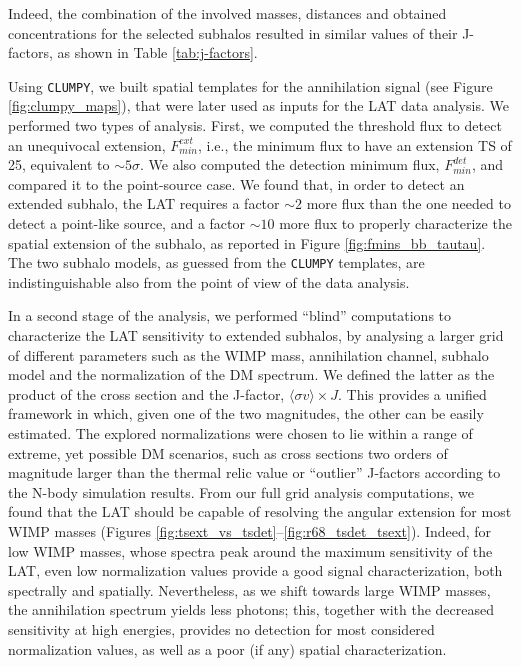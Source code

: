 \documentclass[%
 reprint,
nofootinbib,
 amsmath,amssymb,
 aps,
]{revtex4-2}
\begin{document}
Indeed, the combination of the involved masses, distances and obtained concentrations for the selected subhalos resulted in similar values of their J-factors, as shown in Table \ref{tab:j-factors}.

Using \texttt{CLUMPY}, we built spatial templates for the annihilation signal (see Figure \ref{fig:clumpy_maps}), that were later used as inputs for the LAT data analysis. We performed two types of analysis. First, we computed the threshold flux to detect an unequivocal extension, $F_{min}^{ext}$, i.e., the minimum flux to have an extension TS of 25, equivalent to $\sim 5\sigma$. We also computed the detection minimum flux, $F_{min}^{det}$, and compared it to the point-source case. We found that, in order to detect an extended subhalo, the LAT requires a factor $\sim2$ more flux than the one needed to detect a point-like source, and a factor $\sim10$ more flux to properly characterize the spatial extension of the subhalo, as reported in Figure \ref{fig:fmins_bb_tautau}. The two subhalo models, as guessed from the \texttt{CLUMPY} templates, are indistinguishable also from the point of view of the data analysis.

In a second stage of the analysis, we performed ``blind'' computations to characterize the LAT sensitivity to extended subhalos, by analysing a larger grid of different parameters such as the WIMP mass, annihilation channel, subhalo model and the normalization of the DM spectrum. We defined the latter as the product of the cross section and the J-factor, $\langle\sigma v\rangle \times J$. This provides a unified framework in which, given one of the two magnitudes, the other can be easily estimated. The explored normalizations were chosen to lie within a range of extreme, yet possible DM scenarios, such as cross sections two orders of magnitude larger than the thermal relic value or ``outlier'' J-factors according to the N-body simulation results. From our full grid analysis computations, we found that the LAT should be capable of resolving the angular extension for most WIMP masses (Figures \ref{fig:tsext_vs_tsdet}--\ref{fig:r68_tsdet_tsext}). Indeed, for low WIMP masses, whose spectra peak around the maximum sensitivity of the LAT, even low normalization values provide a good signal characterization, both spectrally and spatially. Nevertheless, as we shift towards large WIMP masses, the annihilation spectrum yields less photons; this, together with the decreased sensitivity at high energies, provides no detection for most considered normalization values, as well as a poor (if any) spatial characterization.
\end{document}
